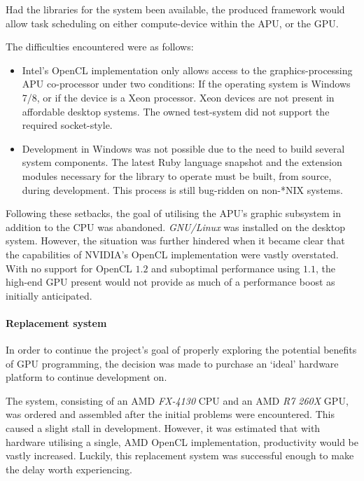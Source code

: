 Had the libraries for the system been available, the produced framework would allow task scheduling on either compute-device within the \ac{APU}, or the \ac{GPU}.

The difficulties encountered were as follows:
\begin{itemize}
  \item Intel's \ac{OpenCL} implementation only allows access to the graphics-processing \ac{APU} co-processor under two conditions: If the operating system is Windows 7/8, or if the device is a Xeon processor. Xeon devices are not present in affordable desktop systems. The owned test-system did not support the required socket-style.

  \item Development in Windows was not possible due to the need to build several system components. The latest Ruby language snapshot and the extension modules necessary for the library to operate must be built, from source, during development. This process is still bug-ridden on non-*NIX systems.
\end{itemize}

Following these setbacks, the goal of utilising the \ac{APU}'s graphic subsystem in addition to the \ac{CPU} was abandoned. \emph{GNU/Linux} was installed on the desktop system. However, the situation was further hindered when it became clear that the capabilities of NVIDIA's \ac{OpenCL} implementation were vastly overstated. With no support for \ac{OpenCL} $1.2$ and suboptimal performance using $1.1$, the high-end \ac{GPU} present would not provide as much of a performance boost as initially anticipated.

\paragraph*{Replacement system}
In order to continue the project's goal of properly exploring the potential benefits of \ac{GPU} programming, the decision was made to purchase an `ideal' hardware platform to continue development on.

The system, consisting of an \ac{AMD} \emph{FX-4130} CPU and an \ac{AMD} \emph{R7 260X} \ac{GPU}, was ordered and assembled after the initial problems were encountered. This caused a slight stall in development. However, it was estimated that with hardware utilising a single, \ac{AMD} \ac{OpenCL} implementation, productivity would be vastly increased. Luckily, this replacement system was successful enough to make the delay worth experiencing.

